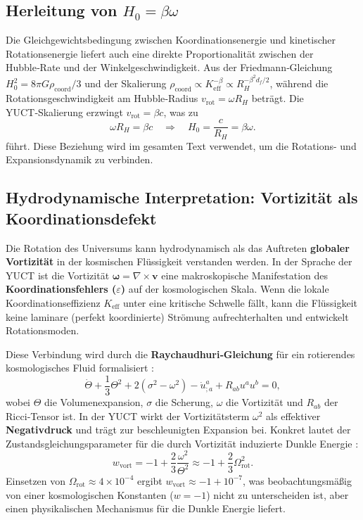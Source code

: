\documentclass[11pt,a4paper]{article}
\begin{document}
	\subsection{Herleitung von \(H_0 = \beta \omega\)}
	
	Die Gleichgewichtsbedingung zwischen Koordinationsenergie und kinetischer Rotationsenergie liefert auch eine direkte Proportionalität zwischen der Hubble‑Rate und der Winkelgeschwindigkeit. Aus der Friedmann‑Gleichung \(H_0^2 = 8\pi G \rho_{\mathrm{coord}} / 3\) und der Skalierung \(\rho_{\mathrm{coord}} \propto K_{\mathrm{eff}}^{-\beta} \propto R_H^{-\beta^2 d_f /2}\), während die Rotationsgeschwindigkeit am Hubble‑Radius \(v_{\mathrm{rot}} = \omega R_H\) beträgt. Die YUCT‑Skalierung erzwingt \(v_{\mathrm{rot}} = \beta c\), was zu
	\begin{equation}
		\omega R_H = \beta c \quad \Rightarrow \quad H_0 = \frac{c}{R_H} = \beta \omega.
		\label{eq:H0-beta-omega}
	\end{equation}
	führt. Diese Beziehung wird im gesamten Text verwendet, um die Rotations- und Expansionsdynamik zu verbinden.
	
	\subsection{Hydrodynamische Interpretation: Vortizität als Koordinationsdefekt}
	
	Die Rotation des Universums kann hydrodynamisch als das Auftreten \textbf{globaler Vortizität} in der kosmischen Flüssigkeit verstanden werden. In der Sprache der YUCT ist die Vortizität \(\boldsymbol{\omega} = \nabla \times \mathbf{v}\) eine makroskopische Manifestation des \textbf{Koordinationsfehlers (\(\varepsilon\))} auf der kosmologischen Skala. Wenn die lokale Koordinationseffizienz \(K_{\mathrm{eff}}\) unter eine kritische Schwelle fällt, kann die Flüssigkeit keine laminare (perfekt koordinierte) Strömung aufrechterhalten und entwickelt Rotationsmoden.
	
	Diese Verbindung wird durch die \textbf{Raychaudhuri‑Gleichung} für ein rotierendes kosmologisches Fluid formalisiert \cite{Ellis1971}:
	\begin{equation}
		\dot{\Theta} + \frac{1}{3}\Theta^2 + 2(\sigma^2 - \omega^2) - \dot{u}^a_{;a} + R_{ab}u^a u^b = 0,
	\end{equation}
	wobei \(\Theta\) die Volumenexpansion, \(\sigma\) die Scherung, \(\omega\) die Vortizität und \(R_{ab}\) der Ricci‑Tensor ist. In der YUCT wirkt der Vortizitätsterm \(\omega^2\) als effektiver \textbf{Negativdruck} und trägt zur beschleunigten Expansion bei. Konkret lautet der Zustandsgleichungsparameter für die durch Vortizität induzierte Dunkle Energie \cite{Tsagas2011}:
	\begin{equation}
		w_{\mathrm{vort}} = -1 + \frac{2}{3}\frac{\omega^2}{\Theta^2} \approx -1 + \frac{2}{3}\Omega_{\mathrm{rot}}^2.
	\end{equation}
	Einsetzen von \(\Omega_{\mathrm{rot}} \approx 4 \times 10^{-4}\) ergibt \(w_{\mathrm{vort}} \approx -1 + 10^{-7}\), was beobachtungsmäßig von einer kosmologischen Konstanten (\(w = -1\)) nicht zu unterscheiden ist, aber einen physikalischen Mechanismus für die Dunkle Energie liefert.
	
\end{document}
